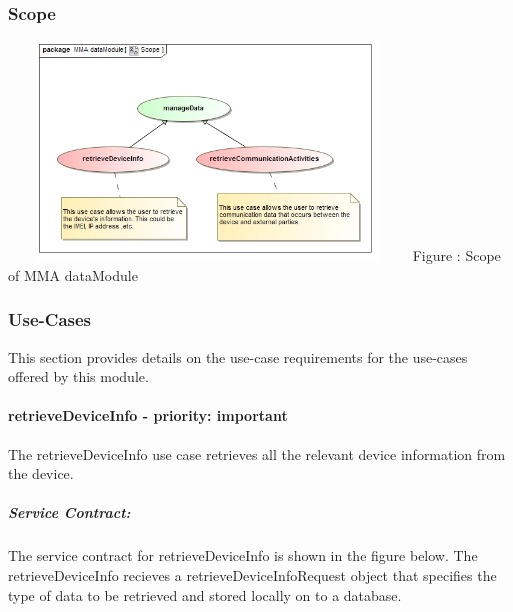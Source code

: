 \documentclass[hidelinks, 12pt, oneside]{article}
\begin{document}
	\subsubsection{Scope}
		\includegraphics[width=400px,height=220px]{img/scopeData.jpg}
		Figure : Scope of MMA dataModule	
		
		
	
	\subsubsection{Use-Cases}
		This section provides details on the use-case requirements for the use-cases offered by this module.	
		
	\paragraph{retrieveDeviceInfo - priority: important}
		The retrieveDeviceInfo use case retrieves all the relevant device information from the device.\newline
		
		\subparagraph{Service Contract:}
		The service contract for retrieveDeviceInfo is shown in the figure below. The retrieveDeviceInfo 			recieves a retrieveDeviceInfoRequest object that specifies the type of data to be retrieved and 			stored locally on to a database.
		
\end{document}

